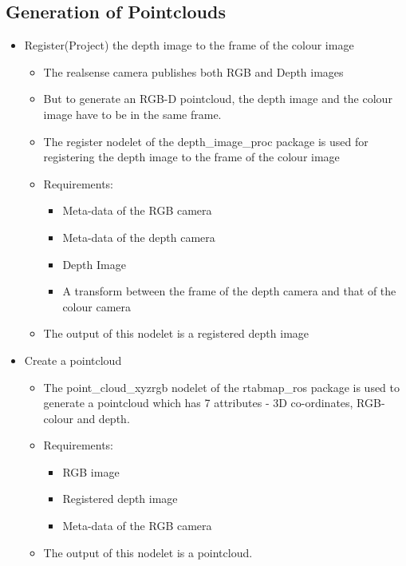 \documentclass[a4paper,12pt,oneside]{book}
\begin{document}
\subsection*{Generation of Pointclouds}
\begin{itemize}

	\item Register(Project) the depth image to the frame of the colour image
		\begin{itemize}
			\item The realsense camera publishes both RGB and Depth images
			\item But to generate an RGB-D pointcloud, the depth image and the colour image have to be in the same frame.
			\item The register nodelet of the depth\_image\_proc package is used for registering the depth image to the frame of the colour image
			\item Requirements:
				\begin{itemize}
					\item Meta-data of the RGB camera
					\item Meta-data of the depth camera
					\item Depth Image
					\item A transform between the frame of the depth camera and that of the colour camera
				\end{itemize}
			\item The output of this nodelet is a registered depth image
		\end{itemize}
	
	\item Create a pointcloud
		\begin{itemize}
			\item The point\_cloud\_xyzrgb nodelet of the rtabmap\_ros package is used to generate a pointcloud which has 7 attributes - 3D co-ordinates, RGB-colour and depth.
			\item Requirements:
				\begin{itemize}
					\item RGB image
					\item Registered depth image
					\item Meta-data of the RGB camera
				\end{itemize}
			\item The output of this nodelet is a pointcloud.
		\end{itemize}
		
\end{itemize}
\end{document}
